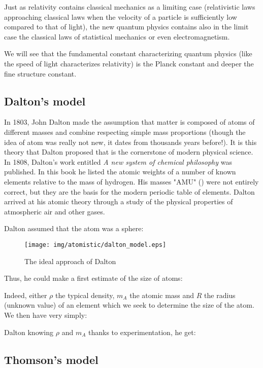 	Just as relativity contains classical mechanics as a limiting case (relativistic laws approaching classical laws when the velocity of a particle is sufficiently low compared to that of light), the new quantum physics contains also in the limit case the classical laws of statistical mechanics or even electromagnetism.

	\begin{tcolorbox}[title=Remark,colframe=black,arc=10pt]
	We will see that the fundamental constant characterizing quantum physics (like the speed of light characterizes relativity) is the Planck constant and deeper the fine structure constant.
	\end{tcolorbox}	

	\subsection{Dalton's model}

In 1803, John Dalton made the assumption that matter is composed of atoms of different masses and combine respecting simple mass proportions (though the idea of atom was really not new, it dates from thousands years before!). It is this theory that Dalton proposed that is the cornerstone of modern physical science. In 1808, Dalton's work entitled \textit{A new system of chemical philosophy} was published. In this book he listed the atomic weights of a number of known elements relative to the mass of hydrogen. His masses "AMU" () were not entirely correct, but they are the basis for the modern periodic table of elements. Dalton arrived at his atomic theory through a study of the physical properties of atmospheric air and other gases.

Dalton assumed that the atom was a sphere:

\begin{figure}[H]
\centering
\texttt{[image: img/atomistic/dalton\_model.eps]}
\caption{The ideal approach of Dalton}
\end{figure}

Thus, he could make a first estimate of the size of atoms:

Indeed, either $\rho$ the typical density, $m_A$ the atomic mass and $R$ the radius (unknown value) of an element which we seek to determine the size of the atom. We then have very simply:
	
Dalton knowing $\rho$ and  $m_A$ thanks to experimentation, he get:
	

\subsection{Thomson's model}

